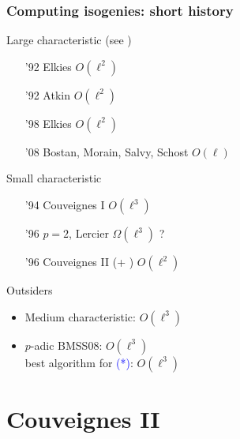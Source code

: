 \documentclass[10pt]{beamer}
\newcommand{\blue}[1]{\textcolor{blue}{#1}}  %
\newcommand{\0}{\mathcal{O}}  %
\begin{document}

\begin{frame}
  \frametitle{Computing isogenies: short history}
  
  \begin{block}{Large characteristic (see \cite{BoMoSaSc08})}
    \begin{itemize}
    \item['92] Elkies \hfill $O(\ell^2)$
    \item['92] Atkin \hfill $O(\ell^2)$
    \item['98] Elkies \hfill $O(\ell^2)$
    \item['08] Bostan, Morain, Salvy, Schost \hfill $O(\ell)$
    \end{itemize}
  \end{block}

  \begin{block}{Small characteristic}
    \begin{itemize}
    \item['94] Couveignes I \hfill $O(\ell^3)$
    \item['96] $p=2$, Lercier \hfill $\Omega(\ell^3)$ ?
    \item['96] Couveignes II (+ \cite{DF07}) \hfill $O(\ell^2)$
    \end{itemize}
  \end{block}

  \begin{block}{Outsiders}
    \begin{itemize}
    \item Medium characteristic: \cite{JL06} \hfill $O(\ell^3)$
    \item $p$-adic BMSS08: \cite{LS09}\hfill $O(\ell^3)$\\
      best algorithm for \blue{(*)}: \hfill $O(\ell^3)$
    \end{itemize}
  \end{block}
\end{frame}


\section{Couveignes II}
\end{document}
